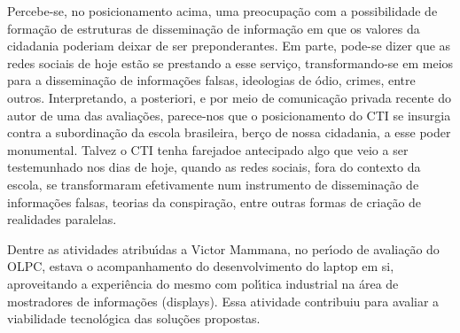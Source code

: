 \documentclass[
12pt,		%
openright,	%
twoside,  %
a4paper,			%
chapter=TITLE,		%
english,			%
french,				%
spanish,			%
brazil				%
]{USPSC-classe/USPSC}
\begin{document}
Percebe-se, no posicionamento acima, uma preocupa\c{c}\~ao com a possibilidade de forma\c{c}\~ao de estruturas de dissemina\c{c}\~ao de informa\c{c}\~ao em que os valores da cidadania poderiam deixar de ser preponderantes. Em parte, pode-se dizer que as redes sociais de hoje est\~ao se prestando a esse servi\c{c}o, transformando-se em meios para a dissemina\c{c}\~ao de informa\c{c}\~oes falsas, ideologias de \'odio, crimes, entre outros. Interpretando, a posteriori, e por meio de comunica\c{c}\~ao privada recente do autor de uma das avalia\c{c}\~oes, parece-nos que o posicionamento do CTI se insurgia contra a subordina\c{c}\~ao da escola brasileira, ber\c{c}o de nossa cidadania, a esse poder monumental. Talvez o CTI tenha \textquotedbl farejado\textquotedbl  e antecipado algo que veio a ser testemunhado nos dias de hoje, quando as redes sociais, fora do contexto da escola, se transformaram efetivamente num instrumento de dissemina\c{c}\~ao de informa\c{c}\~oes falsas, teorias da conspira\c{c}\~ao, entre outras formas de cria\c{c}\~ao de realidades paralelas.

















Dentre as atividades atribu\'{\i}das a Victor Mammana, no per\'{\i}odo de avalia\c{c}\~ao do OLPC, estava o acompanhamento do desenvolvimento do laptop em si, aproveitando a experi\^encia do mesmo com pol\'{\i}tica industrial na \'area de mostradores de informa\c{c}\~oes (displays). Essa atividade contribuiu para avaliar a viabilidade tecnol\'ogica das solu\c{c}\~oes propostas.
\end{document}
